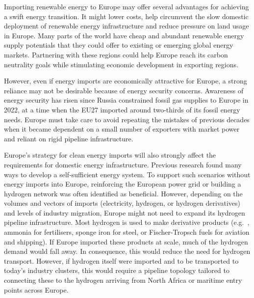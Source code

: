 
Importing renewable energy to Europe may offer several advantages for achieving
a swift energy transition. It might lower costs, help circumvent the slow
domestic deployment of renewable energy infrastructure and reduce pressure on
land usage in Europe. Many parts of the world have cheap and abundant renewable
energy supply potentials that they could offer to existing or emerging global
energy markets.\cite{irenaGlobalHydrogenTrade2022, luxSupplyCurves2021,
vanderzwaanTimmermansDream2021, fasihiLongTermHydrocarbon2017,
reichenbergDeepDecarbonization2022, galvanExportingSunshine2022,
armijoFlexibleProduction2020, pfennigGlobalGISbasedPotential2023} Partnering
with these regions could help Europe reach its carbon neutrality goals while
stimulating economic development in exporting regions.


However, even if energy imports are economically attractive for Europe, a strong
reliance may not be desirable because of energy security concerns. Awareness of
energy security has risen since Russia constrained fossil gas supplies to Europe
in 2022,\cite{pedersenLongtermImplications2022} at a time when the EU27 imported
around two-thirds of its fossil energy needs.\cite{eurostatCompleteEnergyBalances2023}
Europe must take care to avoid repeating the mistakes of previous decades when
it became dependent on a small number of exporters with market power and reliant
on rigid pipeline infrastructure.
 

Europe's strategy for clean energy imports will also strongly affect the
requirements for domestic energy infrastructure. Previous research found many
ways to develop a self-sufficient energy
system.\cite{pickeringDiversityOptions2022, trondleHomemadeImported2019,
brownSynergiesSector2018} To support such scenarios without energy imports into
Europe, reinforcing the European power grid or building a hydrogen network was
often identified as beneficial.\cite{neumannPotentialRoleHydrogen2023,
victoriaSpeedTechnological2022} However, depending on the volumes and vectors of
imports (electricity, hydrogen, or hydrogen derivatives) and levels of industry
migration, Europe might not need to expand its hydrogen pipeline infrastructure.
Most hydrogen is used to make derivative products (e.g.~, ammonia for
fertilisers, sponge iron for steel, or Fischer-Tropsch fuels for aviation and
shipping).\cite{neumannPotentialRoleHydrogen2023} If Europe imported these
products at scale, much of the hydrogen demand would fall away. In consequence,
this would reduce the need for hydrogen transport. However, if hydrogen itself
were imported and to be transported to today's industry clusters, this would
require a pipeline topology tailored to connecting these to the hydrogen
arriving from North Africa or maritime entry points across Europe.

